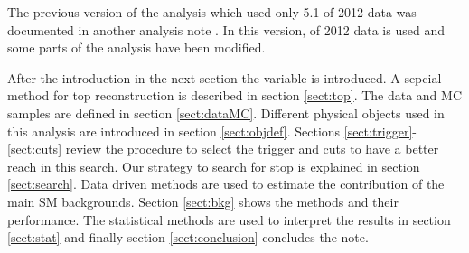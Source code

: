The previous version of the analysis which used only 5.1 \invfb of 2012 data was documented in another analysis note \cite{AN5Invfb}. 
In this version, \IL of 2012 data is used and some parts of the analysis have been modified.

After the introduction in the next section the \mttwo variable is introduced. 
A sepcial method for top reconstruction is described in section \ref{sect:top}.
The data and MC samples are defined in section \ref{sect:dataMC}. 
Different physical objects used in this analysis are introduced in section \ref{sect:objdef}. 
Sections \ref{sect:trigger}-\ref{sect:cuts} review the procedure to 
select the trigger and cuts to have a better reach in this search.
Our strategy to search for stop is explained in section \ref{sect:search}.
Data driven methods are used to estimate the contribution of the main SM backgrounds. 
Section \ref{sect:bkg} shows the methods and their performance.
The statistical methods are used to interpret the results in section \ref{sect:stat} and finally section \ref{sect:conclusion} concludes the note.



